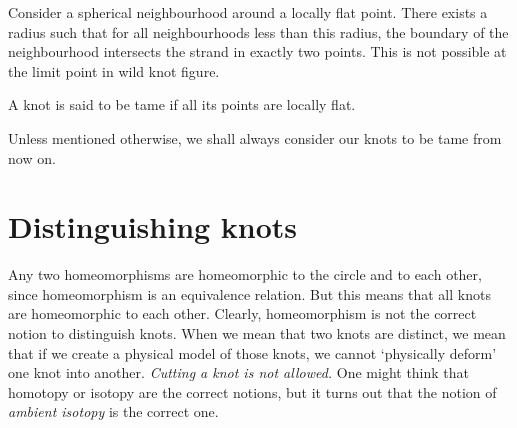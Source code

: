 Consider a spherical neighbourhood around a locally flat point. There exists a radius such that for all neighbourhoods less than this radius, the boundary of the neighbourhood intersects the strand in exactly two points. This is not possible at the limit point in wild knot figure.

\begin{defn}
    A knot is said to be tame if all its points are locally flat.
\end{defn}
Unless mentioned otherwise, we shall always consider our knots to be tame from now on.

\section{Distinguishing knots}

Any two homeomorphisms are homeomorphic to the circle and to each other, since homeomorphism is an equivalence relation. But this means that all knots are homeomorphic to each other. Clearly, homeomorphism is not the correct notion to distinguish knots. When we mean that two knots are distinct, we mean that if we create a physical model of those knots, we cannot `physically deform' one knot into another. \textit{Cutting a knot is not allowed.} One might think that homotopy or isotopy are the correct notions, but it turns out that the notion of \textit{ambient isotopy} is the correct one.



%
%
%

%
%

